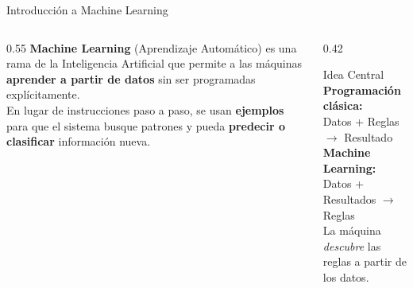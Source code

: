 \documentclass[aspectratio=169]{beamer}
\begin{document}
\begin{frame}{Introducción a Machine Learning}
  \begin{columns}[T]
    \begin{column}{0.55\textwidth}
      \small
      \textbf{Machine Learning} (Aprendizaje Automático) es una rama
      de la Inteligencia Artificial que permite a las máquinas
      \textbf{aprender a partir de datos} sin ser programadas
      explícitamente.\\[8pt]
      En lugar de instrucciones paso a paso, se usan
      \textbf{ejemplos} para que el sistema busque patrones
      y pueda \textbf{predecir o clasificar} información nueva.
    \end{column}
    \begin{column}{0.42\textwidth}
      \begin{conceptbox}{\faBrain\enspace Idea Central}
        \small
        \textbf{Programación clásica:}\\
        Datos + Reglas $\rightarrow$ Resultado\\[6pt]
        \textbf{Machine Learning:}\\
        Datos + Resultados $\rightarrow$ Reglas\\[6pt]
        La máquina \textit{descubre} las reglas
        a partir de los datos.
      \end{conceptbox}
    \end{column}
  \end{columns}
\end{frame}
\end{document}
